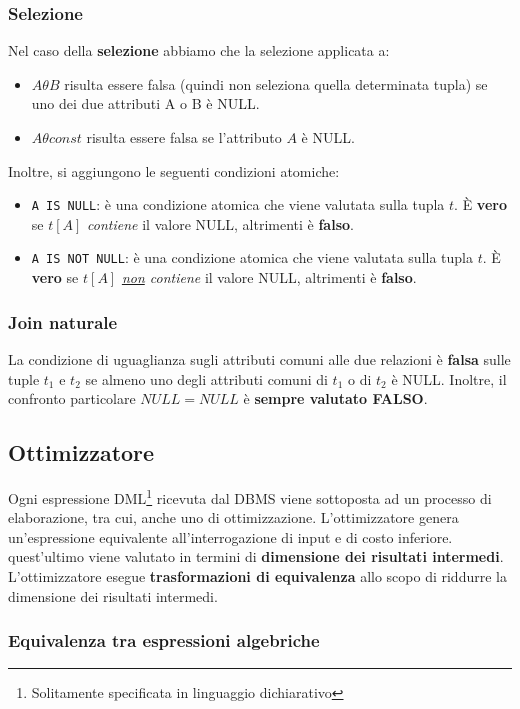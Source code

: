 \documentclass{report}
\begin{document}
\subsubsection{Selezione}
Nel caso della \textbf{selezione} abbiamo che la selezione applicata a:
\begin{itemize}
\item $A \theta B$ risulta essere falsa (quindi non seleziona quella determinata tupla) se uno dei due attributi A o B è NULL.
\item $A \theta const$ risulta essere falsa se l'attributo $A$ \`e NULL.
\end{itemize}
Inoltre, si aggiungono le seguenti condizioni atomiche:
\begin{itemize}
\item \texttt{A IS NULL}: \`e una condizione atomica che viene valutata sulla tupla $t$. \`E \textbf{vero} se $t[A]$ \emph{contiene} il valore NULL, altrimenti \`e \textbf{falso}. 
\item \texttt{A IS NOT NULL}: \`e una condizione atomica che viene valutata sulla tupla $t$. \`E \textbf{vero} se $t[A]$ \emph{\underline{non} contiene} il valore NULL, altrimenti \`e \textbf{falso}.
\end{itemize}

\subsubsection{Join naturale}
La condizione di uguaglianza sugli attributi comuni alle due relazioni \`e \textbf{falsa} sulle tuple $t_1$ e $t_2$ se almeno uno degli attributi comuni di $t_1$ o di $t_2$ \`e NULL. Inoltre, il confronto particolare $NULL = NULL$ \`e \textbf{sempre valutato FALSO}.

\subsection{Ottimizzatore}
Ogni espressione DML\footnote{Solitamente specificata in linguaggio dichiarativo} ricevuta dal DBMS viene sottoposta ad un processo di elaborazione, tra cui, anche uno di ottimizzazione. L’ottimizzatore genera un’espressione equivalente all’interrogazione di input e di costo inferiore. quest'ultimo viene valutato in termini di \textbf{dimensione dei risultati intermedi}.
L’ottimizzatore esegue \textbf{trasformazioni di equivalenza} allo scopo di riddurre la dimensione dei risultati intermedi.

\subsubsection{Equivalenza tra espressioni algebriche}
\end{document}
